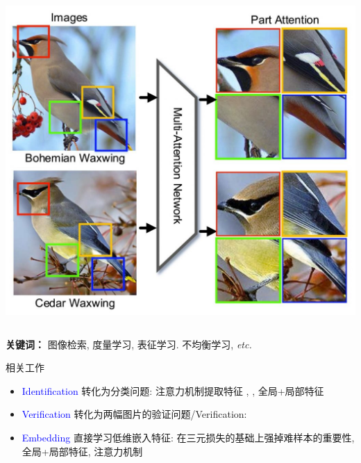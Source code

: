 \documentclass[notes]{beamer}
\begin{document}
\begin{frame}
\begin{columns}
		\includegraphics[width=\textwidth]{2018-03-15-21-58-38.png}

	\end{columns}
	{\bf 关键词：} 图像检索, 度量学习, 表征学习. 不均衡学习, \textit{etc.}
\end{frame}

\begin{frame}
	{相关工作}
	\begin{itemize}
		\item {\textcolor{blue}{Identification}} 转化为分类问题: 注意力机制提取特征 \cite{liu2017hydraplus}, \cite{zhao2017spindle}, 全局+局部特征 \cite{wei2017glad}
		\item {\textcolor{blue}{Verification}} 转化为两幅图片的验证问题/Verification: \cite{Yaqing2016}
		\item {\textcolor{blue}{Embedding}} 直接学习低维嵌入特征: 在三元损失的基础上强掉难样本的重要性\cite{hermans2017defense}, 全局+局部特征\cite{zhang2017align}, 注意力机制\cite{DBLP:journals/corr/ZhaoLWZ17} 
	\end{itemize}
\end{frame}
\end{document}
